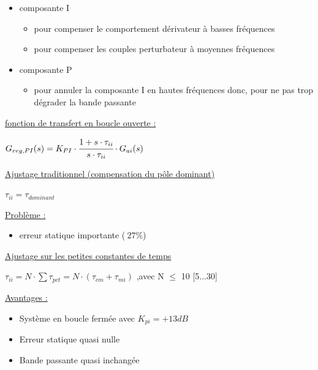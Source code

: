 \documentclass[	DIV=calc,%
							paper=a4,%
							fontsize=10pt,%
							twocolumn]{scrartcl} %
\newcommand{\formtitle}[1]{\large\underline{#1}}
\begin{document}
\begin{itemize}
    \item composante I    
        \begin{itemize}
            \item pour compenser le comportement dérivateur à basses fréquences
            \item pour compenser les couples perturbateur à moyennes fréquences
        \end{itemize}
    \item composante P  
    \begin{itemize}
        \item pour annuler la composante I en hautes fréquences donc, pour ne pas trop dégrader la bande passante
    \end{itemize}
\end{itemize}

\formtitle{fonction de transfert en boucle ouverte : }

\vspace{3mm}

{ $G_{reg,{PI}}(s) =  K_{PI} \cdot \cfrac{1+s\cdot\tau_{ii}}{s\cdot\tau_{ii}} \cdot G_{ai}(s) $}

\vspace{3mm}

\formtitle{Ajustage traditionnel (compensation du pôle dominant)}

\vspace{3mm}
$\tau_{ii} = \tau_{dominant}$
\vspace{3mm}

\underline{Problème :}
\begin{itemize}
    \item  erreur statique importante ($~27\%$)
\end{itemize}

\formtitle{Ajustage sur les petites constantes de temps}

\vspace{3mm}
$\tau_{ii} = N \cdot \sum\tau_{pct} = N \cdot (\tau_{cm}+ \tau_{mi})$ ,avec N $\leq$ 10 [5...30]

\underline{Avantages :}
\begin{itemize}
    \item Système en boucle fermée avec $K_{pi} = +13 dB$
    \item Erreur statique quasi nulle
    \item Bande passante quasi inchangée
\end{itemize}
\end{document}
